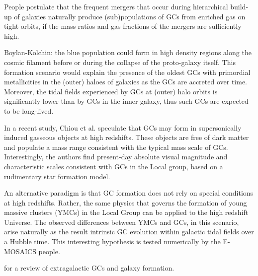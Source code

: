 \documentclass[a4paper,fleqn,usenatbib]{mnras}
\begin{document}
People postulate that the frequent mergers that occur during hierarchical build-up 
of galaxies naturally produce (sub)populations of GCs from enriched gas on tight 
orbits, if the mass ratios and gas fractions of the mergers are sufficiently high.

Boylan-Kolchin: the blue population could form in high density regions along the 
cosmic filament before or during the collapse of the proto-galaxy itself.
This formation scenario would explain the presence of the oldest GCs with 
primordial metallicities in the (outer) haloes of galaxies as the GCs are
accreted over time. Moreover, the tidal fields experienced by GCs at (outer) halo
orbits is significantly lower than by GCs in the inner galaxy, thus such GCs
are expected to be long-lived.

In a recent study, Chiou et al. speculate that GCs may form in supersonically
induced gasseous objects at high redshifts. These objects are free of dark matter 
and populate a mass range consistent with the typical mass scale of GCs. 
Interestingly, the authors find present-day absolute visual magnitude and 
characteristic scales consistent with GCs in the Local group, based on a 
rudimentary star formation model.

An alternative paradigm is that GC formation does not rely on special conditions
at high redshifts. Rather, the same physics that governs the formation of young 
massive clusters (YMCs) in the Local Group can be applied to the high redshift
Universe. The observed differences between YMCs and GCs, in this scenario, arise
naturally as the result intrinsic GC evolution within galactic tidal fields over
a Hubble time. This interesting hypothesis is tested numerically by the E-MOSAICS
people.


\citet{2006ARA&A..44..193B} for a review of extragalactic GCs and galaxy
formation. 





%
%
\end{document}
